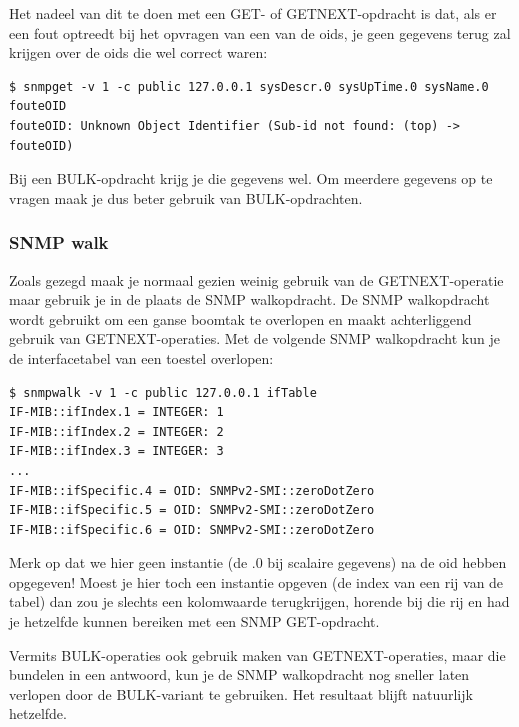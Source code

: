 Het nadeel van dit te doen met een GET- of GETNEXT-opdracht is dat, als er een fout optreedt bij het opvragen
van een van de \glspl{oid}, je geen gegevens terug zal krijgen over de \glspl{oid} die wel correct waren:

\begin{lstlisting}[float=h, caption={Meerdere gegevens opvragen met SNMP GET met een foute OID}, label=netsnmp-get-meerdere-fout]
$ snmpget -v 1 -c public 127.0.0.1 sysDescr.0 sysUpTime.0 sysName.0 fouteOID
fouteOID: Unknown Object Identifier (Sub-id not found: (top) -> fouteOID)
\end{lstlisting}

Bij een BULK-opdracht krijg je die gegevens wel.
Om meerdere gegevens op te vragen maak je dus beter gebruik van BULK-opdrachten.


\subsubsection{SNMP walk}
\label{snmp-walk}

Zoals gezegd maak je normaal gezien weinig gebruik van de GETNEXT-operatie maar gebruik je in de plaats de SNMP walkopdracht.
De SNMP walkopdracht wordt gebruikt om een ganse boomtak te overlopen en maakt achterliggend gebruik van GETNEXT-operaties.
Met de volgende SNMP walkopdracht kun je de interfacetabel van een toestel overlopen:

\begin{lstlisting}[caption={SNMP walkopdracht}, label=netsnmp-walk]
$ snmpwalk -v 1 -c public 127.0.0.1 ifTable
IF-MIB::ifIndex.1 = INTEGER: 1
IF-MIB::ifIndex.2 = INTEGER: 2
IF-MIB::ifIndex.3 = INTEGER: 3
...
IF-MIB::ifSpecific.4 = OID: SNMPv2-SMI::zeroDotZero
IF-MIB::ifSpecific.5 = OID: SNMPv2-SMI::zeroDotZero
IF-MIB::ifSpecific.6 = OID: SNMPv2-SMI::zeroDotZero
\end{lstlisting}

Merk op dat we hier geen instantie (de .0 bij scalaire gegevens) na de \gls{oid} hebben opgegeven!
Moest je hier toch een instantie opgeven (de index van een rij van de tabel) dan zou je slechts een kolomwaarde terugkrijgen,
horende bij die rij en had je hetzelfde kunnen bereiken met een SNMP GET-opdracht.

Vermits BULK-operaties ook gebruik maken van GETNEXT-operaties, maar die bundelen in een antwoord,
kun je de SNMP walkopdracht nog sneller laten verlopen door de BULK-variant te gebruiken.
Het resultaat blijft natuurlijk hetzelfde.

